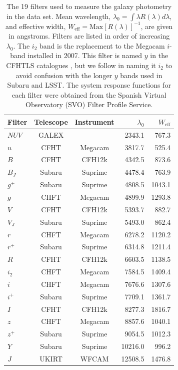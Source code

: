 \begin{table}
    \centering
    \caption{The 19 filters used to measure the galaxy photometry in the data set. Mean wavelength, $\lambda_0 = \int \lambda R(\lambda) d\lambda$, and effective width, $W_\text{eff} = \text{Max}[R(\lambda)]^{-1}$, are given in angstroms. Filters are listed in order of increasing $\lambda_0$. The $i_2$ band is the replacement to the Megacam $i$-band installed in 2007. This filter is named $y$ in the CFHTLS catalogues \citep{Hudelot2012}, but we follow \citet{Zhou2019a} in naming it $i_2$ to avoid confusion with the longer $y$ bands used in Subaru and LSST. The system response functions for each filter were obtained from the Spanish Virtual Observatory (SVO) Filter Profile Service.}
    \begin{tabular}{l c c r r}
        \hline \hline
        Filter & Telescope & Instrument & $\lambda_0$ & $W_\text{eff}$ \\
        \hline
        
        $NUV$ & GALEX  &         &  2343.1 &  767.3 \\
        $u$   & CFHT   & Megacam &  3817.7 &  525.4 \\
        $B$   & CFHT   & CFH12k  &  4342.5 &  873.6 \\
        $B_J$ & Subaru & Suprime &  4478.4 &  763.9 \\
        $g^+$ & Subaru & Suprime &  4808.5 & 1043.1 \\
        $g$   & CHFT   & Megacam &  4899.9 & 1293.8 \\
        $V$   & CFHT   & CFH12k  &  5393.7 &  882.7 \\
        $V_J$ & Subaru & Suprime &  5493.0 &  862.4 \\
        $r$   & CHFT   & Megacam &  6278.2 & 1120.2 \\
        $r^+$ & Subaru & Suprime &  6314.8 & 1211.4 \\
        $R$   & CFHT   & CFH12k  &  6603.5 & 1138.5 \\
        $i_2$ & CHFT   & Megacam &  7584.5 & 1409.4 \\
        $i$   & CHFT   & Megacam &  7676.6 & 1307.6 \\
        $i^+$ & Subaru & Suprime &  7709.1 & 1361.7 \\
        $I$   & CFHT   & CFH12k  &  8277.3 & 1816.7 \\
        $z$   & CHFT   & Megacam &  8857.6 & 1040.1 \\
        $z^+$ & Subaru & Suprime &  9054.5 & 1012.3 \\
        $Y$   & Subaru & Suprime & 10216.0 &  996.2 \\
        $J$   & UKIRT  & WFCAM   & 12508.5 & 1476.8 \\
        
        \hline
    \end{tabular}
    \label{tab:filters}
\end{table}

